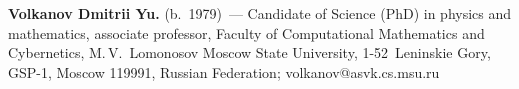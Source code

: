 \vspace*{3pt}

\noindent
\textbf{Volkanov Dmitrii Yu.} (b.\ 1979)~--- Candidate of Science (PhD) in physics and mathematics, associate 
professor, Faculty of Computational Mathematics and Cybernetics, M.\,V.~Lomonosov Moscow State University, 
1-52~Leninskie Gory, GSP-1, Moscow 119991, Russian Federation; \mbox{volkanov@asvk.cs.msu.ru}



\label{end\stat}

\renewcommand{\bibname}{\protect\rm Литература} 